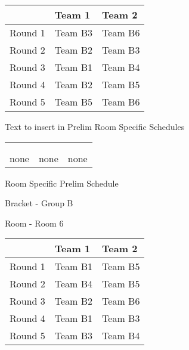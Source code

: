 \documentclass{article}%
\begin{document}
%
\begin{tabularx}{\textwidth}{|c|Y|Y|}%
\hline%
&Team 1&Team 2\\%
\hline%
Round 1&Team B3&Team B6\\%
Round 2&Team B2&Team B3\\%
Round 3&Team B1&Team B4\\%
Round 4&Team B2&Team B5\\%
Round 5&Team B5&Team B6\\%
\hline%
\end{tabularx}%
\vspace*{8pt}%
Text to insert in Prelim Room Specific Schedules%
\vspace*{30pt}%
\newline%
%
\begin{tabularx}{\textwidth}{YYY}%
  &  &  \\%
\\%
none&none&none\\%
\end{tabularx}%
\newpage%
\begin{center}%
\begin{Huge}%
Room Specific Prelim Schedule%
\end{Huge}%
\vspace*{8pt}%
\linebreak%
\begin{Large}%
Bracket {-} Group B%
\end{Large}%
\vspace*{8pt}%
\linebreak%
\vspace*{8pt}%
\begin{Large}%
Room {-} Room 6%
\end{Large}%
\end{center}%
%
\begin{tabularx}{\textwidth}{|c|Y|Y|}%
\hline%
&Team 1&Team 2\\%
\hline%
Round 1&Team B1&Team B5\\%
Round 2&Team B4&Team B5\\%
Round 3&Team B2&Team B6\\%
Round 4&Team B1&Team B3\\%
Round 5&Team B3&Team B4\\%
\hline%
\end{tabularx}%
\vspace*{8pt}%
\end{document}
